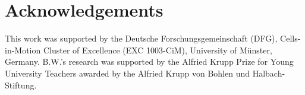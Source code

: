 \documentclass[10pt,a4paper,oneside,final]{article}
\numberwithin{equation}{section}
\theoremstyle{plain}
\theoremstyle{definition}
\theoremstyle{remark}
\begin{document}
\section*{Acknowledgements}
This work was supported by the Deutsche Forschungsgemeinschaft (DFG), Cells-in-Motion Cluster of Excellence (EXC 1003-CiM), University of M\"unster, Germany.
B.W.'s research was supported by the Alfried Krupp Prize for Young University Teachers awarded by the Alfried Krupp von Bohlen und Halbach-Stiftung.



\end{document}
